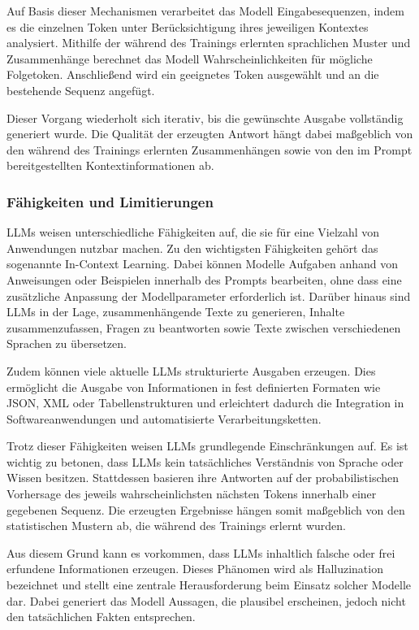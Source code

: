 Auf Basis dieser Mechanismen verarbeitet das Modell Eingabesequenzen, indem es die einzelnen Token unter Berücksichtigung ihres jeweiligen Kontextes analysiert. Mithilfe der während des Trainings erlernten sprachlichen Muster und Zusammenhänge berechnet das Modell Wahrscheinlichkeiten für mögliche Folgetoken. Anschließend wird ein geeignetes Token ausgewählt und an die bestehende Sequenz angefügt.

Dieser Vorgang wiederholt sich iterativ, bis die gewünschte Ausgabe vollständig generiert wurde. Die Qualität der erzeugten Antwort hängt dabei maßgeblich von den während des Trainings erlernten Zusammenhängen sowie von den im Prompt bereitgestellten Kontextinformationen ab.

\subsubsection{Fähigkeiten und Limitierungen}

LLMs weisen unterschiedliche Fähigkeiten auf, die sie für eine Vielzahl von Anwendungen nutzbar machen. Zu den wichtigsten Fähigkeiten gehört das sogenannte In-Context Learning. Dabei können Modelle Aufgaben anhand von Anweisungen oder Beispielen innerhalb des Prompts bearbeiten, ohne dass eine zusätzliche Anpassung der Modellparameter erforderlich ist. Darüber hinaus sind LLMs in der Lage, zusammenhängende Texte zu generieren, Inhalte zusammenzufassen, Fragen zu beantworten sowie Texte zwischen verschiedenen Sprachen zu übersetzen.

Zudem können viele aktuelle LLMs strukturierte Ausgaben erzeugen. Dies ermöglicht die Ausgabe von Informationen in fest definierten Formaten wie JSON, XML oder Tabellenstrukturen und erleichtert dadurch die Integration in Softwareanwendungen und automatisierte Verarbeitungsketten.

Trotz dieser Fähigkeiten weisen LLMs grundlegende Einschränkungen auf. Es ist wichtig zu betonen, dass LLMs kein tatsächliches Verständnis von Sprache oder Wissen besitzen. Stattdessen basieren ihre Antworten auf der probabilistischen Vorhersage des jeweils wahrscheinlichsten nächsten Tokens innerhalb einer gegebenen Sequenz. Die erzeugten Ergebnisse hängen somit maßgeblich von den statistischen Mustern ab, die während des Trainings erlernt wurden.

Aus diesem Grund kann es vorkommen, dass LLMs inhaltlich falsche oder frei erfundene Informationen erzeugen. Dieses Phänomen wird als Halluzination bezeichnet und stellt eine zentrale Herausforderung beim Einsatz solcher Modelle dar. Dabei generiert das Modell Aussagen, die plausibel erscheinen, jedoch nicht den tatsächlichen Fakten entsprechen.

